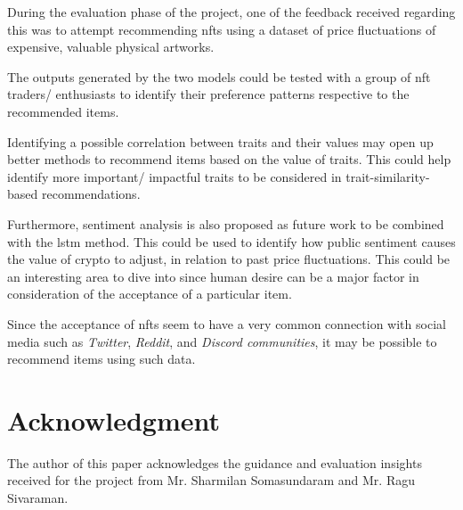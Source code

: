 \documentclass[conference]{IEEEtran}
\begin{document}
During the evaluation phase of the project, one of the feedback received regarding this was to attempt recommending \gls{nft}s using a dataset of price fluctuations of expensive, valuable physical artworks.


\bigbreak
The outputs generated by the two models could be tested with a group of \gls{nft} traders/ enthusiasts to identify their preference patterns respective to the recommended items.

Identifying a possible correlation between traits and their values may open up better methods to recommend items based on the value of traits. This could help identify more important/ impactful traits to be considered in trait-similarity-based recommendations.

\bigbreak
Furthermore, sentiment analysis is also proposed as future work to be combined with the \gls{lstm} method. This could be used to identify how public sentiment causes the value of crypto to adjust, in relation to past price fluctuations. This could be an interesting area to dive into since human desire can be a major factor in consideration of the acceptance of a particular item.

Since the acceptance of \gls{nft}s seem to have a very common connection with social media such as \textit{Twitter}, \textit{Reddit}, and \textit{Discord communities}, it may be possible to recommend items using such data.

\section*{Acknowledgment}

The author of this paper acknowledges the guidance and evaluation insights received for the project from Mr. Sharmilan Somasundaram and Mr. Ragu Sivaraman.

\end{document}
